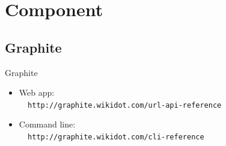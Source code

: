 \documentclass[smaller]{beamer} %
\begin{document}
\section{Component}
\subsection{Graphite}
\begin{frame}[fragile]{Graphite}
    \begin{itemize}
        \item Web app: \\
        {\tt \ \ http://graphite.wikidot.com/url-api-reference}
        \item Command line: \\
        {\tt \ \ http://graphite.wikidot.com/cli-reference}
    \end{itemize}
\end{frame}
\end{document}
